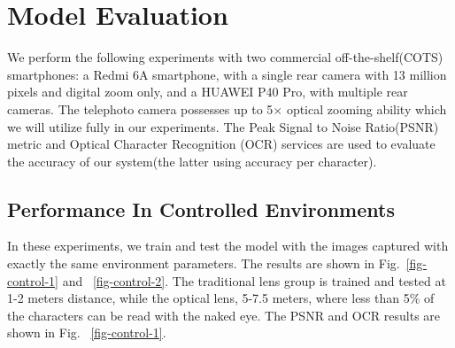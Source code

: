 \section{Model Evaluation}
\label{sec-evaluation}
We perform the following experiments with two commercial off-the-shelf(COTS) smartphones: a Redmi 6A smartphone, with a single rear camera with 13 million pixels and digital zoom only, and a HUAWEI P40 Pro, with multiple rear cameras. The telephoto camera possesses up to 5$\times$ optical zooming ability which we will utilize fully in our experiments. The Peak Signal to Noise Ratio(PSNR) metric and Optical Character Recognition (OCR) services are used to evaluate the accuracy of our system(the latter using accuracy per character).
 
\subsection{Performance In Controlled Environments}

In these experiments, we train and test the model with the images captured with exactly the same environment parameters. The results are shown in Fig.~\ref{fig-control-1} and ~\ref{fig-control-2}. The traditional lens group is trained and tested at 1-2 meters distance, while the optical lens, 5-7.5 meters, where less than 5\% of the characters can be read with the naked eye. The PSNR and OCR results are shown in Fig. ~\ref{fig-control-1}.

